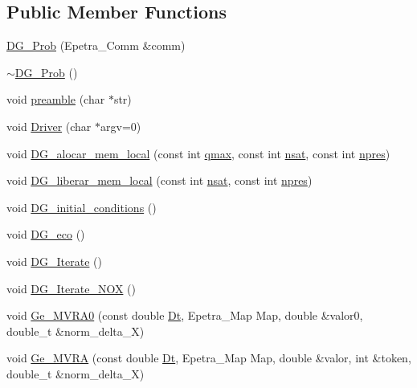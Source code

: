 \subsection*{Public Member Functions}
\begin{DoxyCompactItemize}
\item 
\hyperlink{classDG__Prob_aaa40b75df07b3580d72d012d3e16649e}{D\+G\+\_\+\+Prob} (Epetra\+\_\+\+Comm \&comm)
\item 
\hyperlink{classDG__Prob_ac7d67077fa8154c22a52d63a24db7fba}{$\sim$\+D\+G\+\_\+\+Prob} ()
\item 
void \hyperlink{classDG__Prob_a43fca83a2395515cd1c0c3083463532d}{preamble} (char $\ast$str)
\item 
void \hyperlink{classDG__Prob_a015d792341ee05b1b3eaef7990bf1e06}{Driver} (char $\ast$argv=0)
\item 
void \hyperlink{classDG__Prob_a646bbb0fd2786395486c09b1aa6b2653}{D\+G\+\_\+alocar\+\_\+mem\+\_\+local} (const int \hyperlink{DG__EI__Header_8h_ae7d322bf04f258ba21ba82aed62c1895}{qmax}, const int \hyperlink{DG__EI__Header_8h_af01d48e9515a349111be3909b9ff2a81}{nsat}, const int \hyperlink{DG__EI__Header_8h_ab47785cba577090bf34c319609e1a039}{npres})
\item 
void \hyperlink{classDG__Prob_a06e10d482a426f07f66be721dbc4bb88}{D\+G\+\_\+liberar\+\_\+mem\+\_\+local} (const int \hyperlink{DG__EI__Header_8h_af01d48e9515a349111be3909b9ff2a81}{nsat}, const int \hyperlink{DG__EI__Header_8h_ab47785cba577090bf34c319609e1a039}{npres})
\item 
void \hyperlink{classDG__Prob_a8241ca6884495f863179ea86129b055e}{D\+G\+\_\+initial\+\_\+conditions} ()
\item 
void \hyperlink{classDG__Prob_a88ea70f33384c520034fab83e7db8e7e}{D\+G\+\_\+eco} ()
\item 
void \hyperlink{classDG__Prob_ac4dfaa4ea6466833ecb5cc5c3fcb3875}{D\+G\+\_\+\+Iterate} ()
\item 
void \hyperlink{classDG__Prob_af49f46574209aa53e1f2b3529f6a09fb}{D\+G\+\_\+\+Iterate\+\_\+\+N\+OX} ()
\item 
void \hyperlink{classDG__Prob_a4874e2992ccde1658a6ab46bc595779f}{Ge\+\_\+\+M\+V\+R\+A0} (const double \hyperlink{classDG__Prob_ad4de8afc3624f6559222e8f1f10fce6f}{Dt}, Epetra\+\_\+\+Map Map, double \&valor0, double\+\_\+t \&norm\+\_\+delta\+\_\+X)
\item 
void \hyperlink{classDG__Prob_af4fefe289d5d1beb69636817eb9f9703}{Ge\+\_\+\+M\+V\+RA} (const double \hyperlink{classDG__Prob_ad4de8afc3624f6559222e8f1f10fce6f}{Dt}, Epetra\+\_\+\+Map Map, double \&valor, int \&token, double\+\_\+t \&norm\+\_\+delta\+\_\+X)

\end{DoxyCompactItemize}

